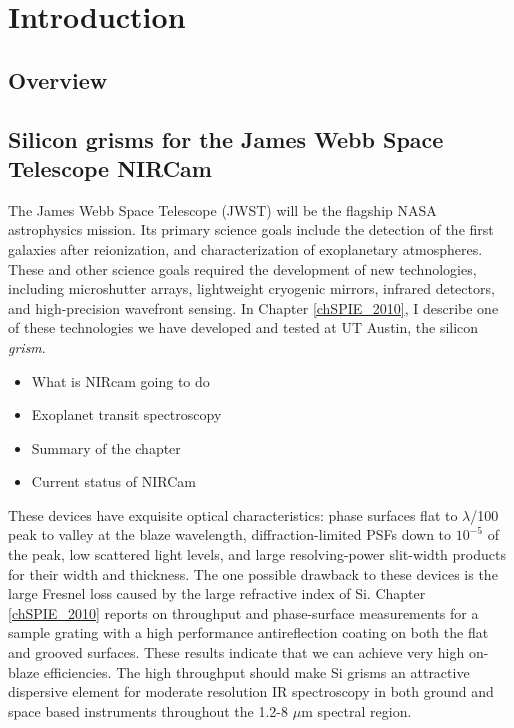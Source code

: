 \chapter{Introduction}


\section{Overview}

\section{Silicon grisms for the James Webb Space Telescope NIRCam}

The James Webb Space Telescope (JWST) will be the flagship NASA astrophysics mission.  Its primary science goals include the detection of the first galaxies after reionization, and characterization of exoplanetary atmospheres.  These and other science goals required the development of new technologies, including microshutter arrays, lightweight cryogenic mirrors, infrared detectors, and high-precision wavefront sensing.  In Chapter \ref{chSPIE_2010}, I describe one of these technologies we have developed and tested at UT Austin, the silicon \emph{grism}.

\begin{itemize}
	\item What is NIRcam going to do
	\item Exoplanet transit spectroscopy
	\item Summary of the chapter
	\item Current status of NIRCam
\end{itemize}  

These devices have exquisite optical characteristics: phase surfaces flat to $\lambda$/100 peak to valley at the blaze wavelength, diffraction-limited PSFs down to $10^{-5}$ of the peak, low scattered light levels, and large resolving-power slit-width products for their width and thickness.  The one possible drawback to these devices is the large Fresnel loss caused by the large refractive index of Si.  Chapter \ref{chSPIE_2010} reports on throughput and phase-surface measurements for a sample grating with a high performance antireflection coating on both the flat and grooved surfaces. These results indicate that we can achieve very high on-blaze efficiencies.  The high throughput should make Si grisms an attractive dispersive element for moderate resolution IR spectroscopy in both ground and space based instruments throughout the 1.2-8 $\mu$m spectral region.



